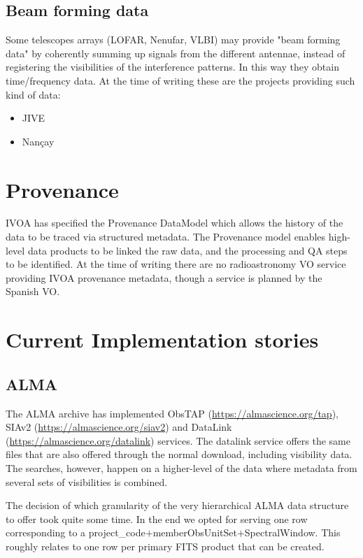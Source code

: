 \documentclass[11pt,a4paper]{ivoa}
\begin{document}
\subsection{Beam forming data}
Some telescopes arrays (LOFAR, Nenufar, VLBI) may provide "beam forming data" by coherently summing up signals from the different antennae, instead of registering the visibilities of the interference patterns. In this way they obtain time/frequency data. At the time of writing these are the projects providing such kind of data:
\begin{itemize}
\item JIVE
\item Nan\c cay
\end{itemize}
\section{Provenance}

IVOA has specified the Provenance DataModel \citep{2020ivoa.spec.0411S} which allows the history of the data to be traced via structured metadata. The Provenance model enables high-level data products to be linked the raw data, and the processing and QA steps to be identified. At the time of writing there are no radioastronomy VO service providing IVOA provenance metadata, though a service is planned by the Spanish VO.   

%



\appendix
\section{ Current Implementation stories}

\subsection{ALMA}
\label{sec:ALMA}
The ALMA archive has implemented ObsTAP (\url{https://almascience.org/tap}), SIAv2 (\url{https://almascience.org/siav2}) and DataLink (\url{https://almascience.org/datalink}) services.
The datalink service offers the same files that are also offered through the normal download, including visibility data. The searches, however,
happen on a higher-level of the data where metadata from several sets of visibilities is combined.

The decision of which granularity of the very hierarchical ALMA data
structure to offer took quite some time. In the end we opted for serving
one row corresponding to a project\_code$+$memberObsUnitSet$+$SpectralWindow. This roughly relates to one row per primary FITS product that can be created.
\end{document}
